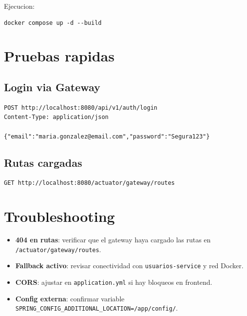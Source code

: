 \documentclass[11pt,a4paper]{article}
\begin{document}
Ejecucion:
\begin{lstlisting}
docker compose up -d --build
\end{lstlisting}

\section{Pruebas rapidas}
\subsection*{Login via Gateway}
\begin{lstlisting}
POST http://localhost:8080/api/v1/auth/login
Content-Type: application/json

{"email":"maria.gonzalez@email.com","password":"Segura123"}
\end{lstlisting}

\subsection*{Rutas cargadas}
\begin{lstlisting}
GET http://localhost:8080/actuator/gateway/routes
\end{lstlisting}

\section{Troubleshooting}
\begin{itemize}
  \item \textbf{404 en rutas}: verificar que el gateway haya cargado las rutas en \texttt{/actuator/gateway/routes}.
  \item \textbf{Fallback activo}: revisar conectividad con \texttt{usuarios-service} y red Docker.
  \item \textbf{CORS}: ajustar en \texttt{application.yml} si hay bloqueos en frontend.
  \item \textbf{Config externa}: confirmar variable \texttt{SPRING\_CONFIG\_ADDITIONAL\_LOCATION=/app/config/}.
\end{itemize}
\end{document}
